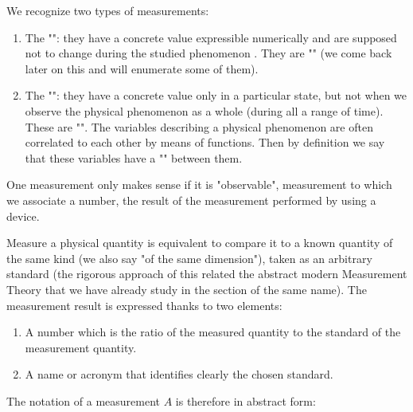 	We recognize two types of measurements:
	\begin{enumerate}
		\item The "": they have a concrete value expressible numerically and are supposed not to change during the studied phenomenon . They are "" (we come back later on this and will enumerate some of them).
		
		\item The "": they have a concrete value only in a particular state, but not when we observe the physical phenomenon as a whole (during all a range of time). These are "". The variables describing a physical phenomenon are often correlated to each other by means of functions. Then by definition we say that these variables have a "" between them.
	\end{enumerate}
	\begin{tcolorbox}[title=Remarks,colframe=black,arc=10pt]
	One measurement only makes sense if it is "observable", measurement to which we associate a number, the result of the measurement performed by using a device.
	\end{tcolorbox}
	Measure a physical quantity is equivalent to compare it to a known quantity of the same kind (we also say "of the same dimension"), taken as an arbitrary standard (the rigorous approach of this related the abstract modern Measurement Theory that we have already study in the section of the same name). The measurement result is expressed thanks to two elements:
	\begin{enumerate}
		\item A number which is the ratio of the measured quantity to the standard of the measurement quantity.

		\item A name or acronym that identifies clearly the chosen standard.
	\end{enumerate}
	The notation of a measurement $A$ is therefore in abstract form:
	
